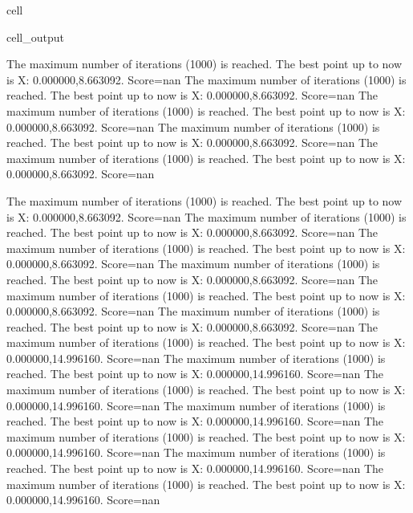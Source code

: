 \documentclass[letterpaper,10pt,english]{jupyterBook}
\begin{document}
\begin{sphinxuseclass}{cell}
\begin{sphinxVerbatimOutput}
\begin{sphinxuseclass}{cell_output}
\begin{sphinxVerbatim}[commandchars=\\\{\}]
The maximum number of iterations (1000) is reached. The best point up to now is X: \PYGZob{}0.000000,8.663092\PYGZcb{}. Score=\PYGZhy{}nan
The maximum number of iterations (1000) is reached. The best point up to now is X: \PYGZob{}0.000000,8.663092\PYGZcb{}. Score=\PYGZhy{}nan
The maximum number of iterations (1000) is reached. The best point up to now is X: \PYGZob{}0.000000,8.663092\PYGZcb{}. Score=\PYGZhy{}nan
The maximum number of iterations (1000) is reached. The best point up to now is X: \PYGZob{}0.000000,8.663092\PYGZcb{}. Score=\PYGZhy{}nan
The maximum number of iterations (1000) is reached. The best point up to now is X: \PYGZob{}0.000000,8.663092\PYGZcb{}. Score=\PYGZhy{}nan
\end{sphinxVerbatim}

\begin{sphinxVerbatim}[commandchars=\\\{\}]
The maximum number of iterations (1000) is reached. The best point up to now is X: \PYGZob{}0.000000,8.663092\PYGZcb{}. Score=\PYGZhy{}nan
The maximum number of iterations (1000) is reached. The best point up to now is X: \PYGZob{}0.000000,8.663092\PYGZcb{}. Score=\PYGZhy{}nan
The maximum number of iterations (1000) is reached. The best point up to now is X: \PYGZob{}0.000000,8.663092\PYGZcb{}. Score=\PYGZhy{}nan
The maximum number of iterations (1000) is reached. The best point up to now is X: \PYGZob{}0.000000,8.663092\PYGZcb{}. Score=\PYGZhy{}nan
The maximum number of iterations (1000) is reached. The best point up to now is X: \PYGZob{}0.000000,8.663092\PYGZcb{}. Score=\PYGZhy{}nan
The maximum number of iterations (1000) is reached. The best point up to now is X: \PYGZob{}0.000000,8.663092\PYGZcb{}. Score=\PYGZhy{}nan
The maximum number of iterations (1000) is reached. The best point up to now is X: \PYGZob{}0.000000,14.996160\PYGZcb{}. Score=\PYGZhy{}nan
The maximum number of iterations (1000) is reached. The best point up to now is X: \PYGZob{}0.000000,14.996160\PYGZcb{}. Score=\PYGZhy{}nan
The maximum number of iterations (1000) is reached. The best point up to now is X: \PYGZob{}0.000000,14.996160\PYGZcb{}. Score=\PYGZhy{}nan
The maximum number of iterations (1000) is reached. The best point up to now is X: \PYGZob{}0.000000,14.996160\PYGZcb{}. Score=\PYGZhy{}nan
The maximum number of iterations (1000) is reached. The best point up to now is X: \PYGZob{}0.000000,14.996160\PYGZcb{}. Score=\PYGZhy{}nan
The maximum number of iterations (1000) is reached. The best point up to now is X: \PYGZob{}0.000000,14.996160\PYGZcb{}. Score=\PYGZhy{}nan
The maximum number of iterations (1000) is reached. The best point up to now is X: \PYGZob{}0.000000,14.996160\PYGZcb{}. Score=\PYGZhy{}nan

\end{sphinxVerbatim}
\end{sphinxuseclass}
\end{sphinxVerbatimOutput}
\end{sphinxuseclass}
\end{document}

